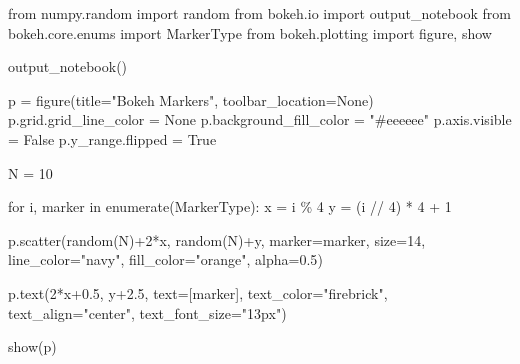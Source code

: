 \documentclass[
  letterpaper,
  DIV=11,
  numbers=noendperiod]{scrreprt}
\newenvironment{Shaded}{\begin{snugshade}}{\end{snugshade}}
\newcommand{\BuiltInTok}[1]{\textcolor[rgb]{0.00,0.23,0.31}{#1}}
\newcommand{\ControlFlowTok}[1]{\textcolor[rgb]{0.00,0.23,0.31}{#1}}
\newcommand{\DecValTok}[1]{\textcolor[rgb]{0.68,0.00,0.00}{#1}}
\newcommand{\FloatTok}[1]{\textcolor[rgb]{0.68,0.00,0.00}{#1}}
\newcommand{\ImportTok}[1]{\textcolor[rgb]{0.00,0.46,0.62}{#1}}
\newcommand{\KeywordTok}[1]{\textcolor[rgb]{0.00,0.23,0.31}{#1}}
\newcommand{\NormalTok}[1]{\textcolor[rgb]{0.00,0.23,0.31}{#1}}
\newcommand{\OperatorTok}[1]{\textcolor[rgb]{0.37,0.37,0.37}{#1}}
\newcommand{\StringTok}[1]{\textcolor[rgb]{0.13,0.47,0.30}{#1}}
\newcommand{\VariableTok}[1]{\textcolor[rgb]{0.07,0.07,0.07}{#1}}
\begin{document}
\begin{Shaded}
\begin{Highlighting}[]
\ImportTok{from}\NormalTok{ numpy.random }\ImportTok{import}\NormalTok{ random}
\ImportTok{from}\NormalTok{ bokeh.io }\ImportTok{import}\NormalTok{ output\_notebook}
\ImportTok{from}\NormalTok{ bokeh.core.enums }\ImportTok{import}\NormalTok{ MarkerType}
\ImportTok{from}\NormalTok{ bokeh.plotting }\ImportTok{import}\NormalTok{ figure, show}


\NormalTok{output\_notebook()}

\NormalTok{p }\OperatorTok{=}\NormalTok{ figure(title}\OperatorTok{=}\StringTok{"Bokeh Markers"}\NormalTok{, toolbar\_location}\OperatorTok{=}\VariableTok{None}\NormalTok{)}
\NormalTok{p.grid.grid\_line\_color }\OperatorTok{=} \VariableTok{None}
\NormalTok{p.background\_fill\_color }\OperatorTok{=} \StringTok{"\#eeeeee"}
\NormalTok{p.axis.visible }\OperatorTok{=} \VariableTok{False}
\NormalTok{p.y\_range.flipped }\OperatorTok{=} \VariableTok{True}

\NormalTok{N }\OperatorTok{=} \DecValTok{10}

\ControlFlowTok{for}\NormalTok{ i, marker }\KeywordTok{in} \BuiltInTok{enumerate}\NormalTok{(MarkerType):}
\NormalTok{    x }\OperatorTok{=}\NormalTok{ i }\OperatorTok{\%} \DecValTok{4}
\NormalTok{    y }\OperatorTok{=}\NormalTok{ (i }\OperatorTok{//} \DecValTok{4}\NormalTok{) }\OperatorTok{*} \DecValTok{4} \OperatorTok{+} \DecValTok{1}

\NormalTok{    p.scatter(random(N)}\OperatorTok{+}\DecValTok{2}\OperatorTok{*}\NormalTok{x, random(N)}\OperatorTok{+}\NormalTok{y, marker}\OperatorTok{=}\NormalTok{marker, size}\OperatorTok{=}\DecValTok{14}\NormalTok{,}
\NormalTok{              line\_color}\OperatorTok{=}\StringTok{"navy"}\NormalTok{, fill\_color}\OperatorTok{=}\StringTok{"orange"}\NormalTok{, alpha}\OperatorTok{=}\FloatTok{0.5}\NormalTok{)}

\NormalTok{    p.text(}\DecValTok{2}\OperatorTok{*}\NormalTok{x}\OperatorTok{+}\FloatTok{0.5}\NormalTok{, y}\OperatorTok{+}\FloatTok{2.5}\NormalTok{, text}\OperatorTok{=}\NormalTok{[marker],}
\NormalTok{           text\_color}\OperatorTok{=}\StringTok{"firebrick"}\NormalTok{, text\_align}\OperatorTok{=}\StringTok{"center"}\NormalTok{, text\_font\_size}\OperatorTok{=}\StringTok{"13px"}\NormalTok{)}

\NormalTok{show(p)}
\end{Highlighting}
\end{Shaded}
\end{document}
